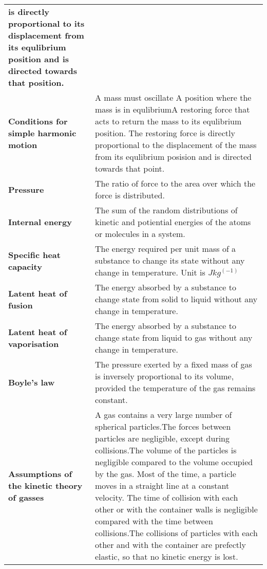 \documentclass{article}
\begin{document}
\begin{longtable}{>{\bf\centering\arraybackslash}p{1in} 
  p{\textwidth-4\tabcolsep-1in}}
    is directly proportional to its displacement from its equlibrium position
    and is directed towards that position.\\
  Conditions for simple harmonic motion & A mass must oscillate \newline
    \newline A position where the mass is in equlibrium\newline \newline A
    restoring force that acts to return the mass to its equlibrium position. The
    restoring force is directly proportional to the displacement of the mass
    from its equlibrium posision and is directed towards that point.\\ \midrule
  Pressure & The ratio of force to the area over which the force is distributed.
    \\\midrule
  Internal energy & The sum of the random distributions of kinetic and
    potiential energies of the atoms or molecules in a system.\\ \midrule
  Specific heat capacity & The energy required per unit mass of a substance to
    change its state without any change in temperature.\newline \newline
    Unit is $Jkg^(-1)$\\ \midrule
  Latent heat of fusion & The energy absorbed by a substance to change state
    from solid to liquid without any change in temperature. \\ \midrule
  Latent heat of vaporisation & The energy absorbed by a substance to change
    state from liquid to gas without any change in temperature. \\ \midrule
  Boyle's law & The pressure exerted by a fixed mass of gas is inversely
    proportional to its volume, provided the temperature of the gas remains
    constant.\\ \midrule
  Assumptions of the kinetic theory of gasses & A gas contains a very large
    number of spherical particles.\newline \newline The forces between particles
    are negligible, except during collisions.\newline \newline The volume of the particles is negligible compared to the volume occupied by the gas.\newline
    \newline Most of the time, a particle moves in a straight line at a constant velocity. The time of collision with each other or with the container walls
    is negligible compared with the time between collisions.\newline \newline The
    collisions of particles with each other and with the container are prefectly
    elastic, so that no kinetic energy is lost.\\ \midrule
\end{longtable}
\end{document}

